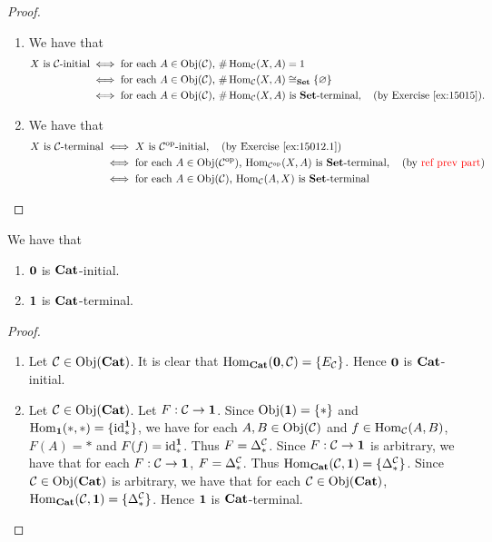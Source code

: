 \documentclass{book}
\begin{document}
	\begin{proof}\
		\begin{enumerate}
			\item We have that
			\begin{align*}
				\text{$X$ is $\MC$-initial}
				& \iff \text{for each $A \in \Obj(\MC)$, $\# \Hom_{\MC}(X, A) = 1$} \\
				& \iff \text{for each $A \in \Obj(\MC)$, $\# \Hom_{\MC}(X, A) \cong_{\bSet} \{\varnothing\}$} \\
				& \iff \text{for each $A \in \Obj(\MC)$, $\# \Hom_{\MC}(X, A)$ is $\bSet$-terminal}, \quad \text{(by \rex{15015})}.
			\end{align*}
			\item We have that
			\begin{align*}
				\text{$X$ is $\MC$-terminal}
				& \iff \text{$X$ is $\op{\MC}$-initial}, \quad \text{(by \rex{15012.1})} \\
				& \iff \text{for each $A \in \Obj(\op{\MC})$, $\Hom_{\op{\MC}}(X, A)$ is $\bSet$-terminal}, \quad \text{(by \tcr{ref prev part})} \\
				& \iff  \text{for each $A \in \Obj(\MC)$, $\Hom_{\MC}(A, X)$ is $\bSet$-terminal}
			\end{align*}
		\end{enumerate}
	\end{proof}
	
	
	\begin{ex} 
		We have that 
		\begin{enumerate}
			\item $\mathbf{0}$ is $\operatorname*{\text{\textbf{Cat}}}$-initial.
			\item $\mathbf{1}$ is $\operatorname*{\text{\textbf{Cat}}}$-terminal. 
		\end{enumerate}
	\end{ex}
	
	\begin{proof}\
		\begin{enumerate}
			\item Let $\mathcal{C} \in \operatorname{Obj}(\operatorname*{\text{\textbf{Cat}}})$. It is clear that $\operatorname{Hom}_{\operatorname*{\text{\textbf{Cat}}}}(\mathbf{0}, \mathcal{C}) = \{E_{\mathcal{C}}\}$. Hence $\mathbf{0}$ is $\operatorname*{\text{\textbf{Cat}}}$-initial. 
			\item Let $\mathcal{C} \in \operatorname{Obj}(\operatorname*{\text{\textbf{Cat}}})$. Let $F:\mathcal{C} \rightarrow \mathbf{1}$. Since $\operatorname{Obj}(\mathbf{1}) = \{*\}$ and $\operatorname{Hom}_{\mathbf{1}}(*, *) = \{\operatorname{id}_*^{\mathbf{1}}\}$, we have for each $A,B \in \operatorname{Obj}(\mathcal{C})$ and $f \in \operatorname{Hom}_{\mathcal{C}}(A,B)$, $F(A) = *$ and $F(f) = \operatorname{id}_*^{\mathbf{1}}$. Thus $F = \Delta^{\mathcal{C}}_*$. Since $F:\mathcal{C} \rightarrow \mathbf{1}$ is arbitrary, we have that for each $F:\mathcal{C} \rightarrow \mathbf{1}$, $F = \Delta^{\mathcal{C}}_*$. Thus $\operatorname{Hom}_{\operatorname*{\text{\textbf{Cat}}}}(\mathcal{C}, \mathbf{1}) = \{ \Delta^{\mathcal{C}}_* \}$. Since $\mathcal{C} \in \operatorname{Obj}(\operatorname*{\text{\textbf{Cat}}})$ is arbitrary, we have that for each $\mathcal{C} \in \operatorname{Obj}(\operatorname*{\text{\textbf{Cat}}})$, $\operatorname{Hom}_{\operatorname*{\text{\textbf{Cat}}}}(\mathcal{C}, \mathbf{1}) = \{ \Delta^{\mathcal{C}}_* \}$. Hence $\mathbf{1}$ is $\operatorname*{\text{\textbf{Cat}}}$-terminal.
		\end{enumerate}
	\end{proof}
	
\end{document}
